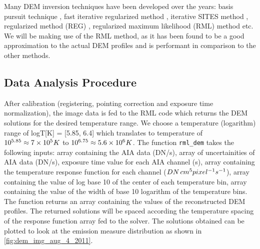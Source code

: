 Many DEM inversion techniques have been developed over the years: basis pursuit technique \citep{Cheung2015}, fast iterative regularized method \citep{Plowman2013}, iterative SITES method \citep{Morgan2019}, regularized method (REG) \citep{Hannah2012}, regularized maximum likelihood (RML) method \citep{Massa2023} etc. We will be making use of the RML method, as it has been found to be a good approximation to the actual DEM profiles and is performant in comparison to the other methods.

\subsection{Data Analysis Procedure}
\label{sec:data_analysis_procedure}

After calibration (registering, pointing correction and exposure time normalization), the image data is fed to the RML code {\citep{Massa2023}} which returns the DEM solutions for the desired temperature range. We choose a temperature (logarithm) range of logT[K] = [5.85, 6.4] which translates to temperature of $10^{5.85} \approx 7 \times 10^5 \hspace{0.1mm} K$ to $10^{6.75} \approx 5.6 \times 10^6 \hspace{0.1mm} K$. The function \texttt{rml\_dem} takes the following inputs: array containing the AIA data (DN/s), array of uncertainities of AIA data (DN/s), exposure time value for each AIA channel (s), array containing the temperature response function for each channel ($ DN \hspace{0.5mm} cm^5 pixel^{-1} s^{-1}$), array containing the value of log base 10 of the center of each temperature bin, array containing the value of the width of base 10 logarithm of the temperature bins. The function returns an array containing the values of the reconstructed DEM profiles. The returned solutions will be spaced according the temperature spacing of the response function array fed to the solver. The solutions obtained can be plotted to look at the emission measure distribution as shown in \cref{fig:dem_img_aug_4_2011}.\\

